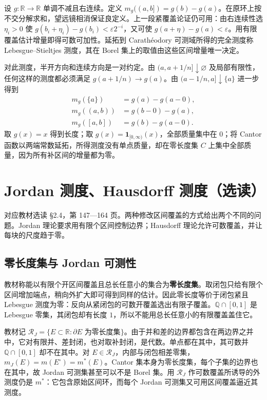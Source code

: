 \documentclass[11pt,a4paper]{article}
\begin{document}
设 \(g:\mathbb R\to\mathbb R\) 单调不减且右连续。定义 \(m_g((a,b])=g(b)-g(a)\)。在原环上按不交分解求和，望远镜相消保证良定义。上一段紧覆盖论证仍可用：由右连续性选 \(\eta_i>0\) 使 \(g(b_i+\eta_i)-g(b_i)<\varepsilon 2^{-i}\)，又可使 \(g(a+\eta)-g(a)<\varepsilon\)。用有限覆盖估计增量即得可数可加性。延拓到 Carathéodory 可测域所得的完全测度称 Lebesgue--Stieltjes 测度，其在 Borel 集上的取值由这些区间增量唯一决定。

对此测度，半开方向和连续方向是一对约定。由 \((a,a+1/n]\downarrow\varnothing\) 及局部有限性，任何这样的测度都必须满足 \(g(a+1/n)\to g(a)\)。由 \((a-1/n,a]\downarrow\{a\}\) 进一步得到 \[
\begin{aligned}
m_g(\{a\})&=g(a)-g(a-0),\\
m_g((a,b))&=g(b-0)-g(a),\\
m_g([a,b])&=g(b)-g(a-0).
\end{aligned}
\] 取 \(g(x)=x\) 得到长度；取 \(g(x)=\mathbf1_{[0,\infty)}(x)\)，全部质量集中在 \(0\)；将 Cantor 函数以两端常数延拓，所得测度没有单点质量，却在零长度集 \(C\) 上集中全部质量，因为所有补区间的增量都为零。

\section{Jordan 测度、Hausdorff 测度（选读）}
对应教材选读 \S{}2.4，第 147---164 页。两种修改区间覆盖的方式给出两个不同的问题。Jordan 理论要求用有限个区间控制边界；Hausdorff 理论允许可数覆盖，并让每块的尺度趋于零。

\subsection*{零长度集与 Jordan 可测性}\label{ux96f6ux957fux5ea6ux96c6ux4e0e-jordan-ux53efux6d4bux6027}

教材称能以有限个开区间覆盖且总长任意小的集合为\textbf{零长度集}。取闭包只给有限个区间增加端点，稍向外扩大即可得到同样的估计。因此零长度等价于闭包紧且 Lebesgue 测度为零：反向从紧闭包的可数开覆盖选出有限子覆盖。\(\mathbb Q\cap[0,1]\) 是 Lebesgue 零集，其闭包却有长度 \(1\)，所以不能用总长任意小的有限覆盖盖住它。

教材记 \(\mathcal R_J=\{E\subset\mathbb R:\partial E\text{ 为零长度集}\}\)。由于并和差的边界都包含在两边界之并中，它对有限并、差封闭，也对取补封闭，是代数。单点都在其中，其可数并 \(\mathbb Q\cap[0,1]\) 却不在其中。对 \(E\in\mathcal R_J\)，内部与闭包相差零集，\(m_J(E)=m(E^\circ)=m^*(E)\)。Cantor 集本身为零长度集，每个子集的边界也在其中，故 Jordan 可测集甚至可以不是 Borel 集。用 \(\mathcal R_J\) 作可数覆盖所诱导的外测度仍是 \(m^*\)：它包含原始区间环，而每个 Jordan 可测集又可用区间覆盖逼近其测度。
\end{document}
